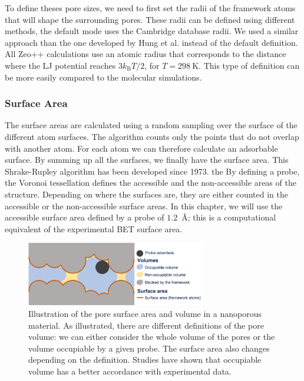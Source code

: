 \documentclass[main.tex]{subfiles}
\begin{document}
To define theses pore sizes, we need to first set the radii of the framework atoms that will shape the surrounding pores. These radii can be defined using different methods, the default mode uses the Cambridge database radii. We used a similar approach than the one developed by Hung et al. instead of the default definition.\cite{Hung_2021} All Zeo++ calculations use an atomic radius that corresponds to the distance where the LJ potential reaches $3 k_\text{B} T/2$, for $T = \SI{298}{\kelvin}$. This type of definition can be more easily compared to the molecular simulations.

\subsubsection{Surface Area}

The surface areas are calculated using a random sampling over the surface of the different atom surfaces. The algorithm counts only the points that do not overlap with another atom. For each atom we can therefore calculate an adsorbable surface. By summing up all the surfaces, we finally have the surface area. This Shrake-Rupley algorithm has been developed since 1973.\cite{Shrake1973} the By defining a probe, the Voronoi tessellation defines the accessible and the non-accessible areas of the structure. Depending on where the surfaces are, they are either counted in the accessible or the non-accessible surface areas. In this chapter, we will use the accessible surface area defined by a probe of $1.2$~\si{\angstrom}; this is a computational equivalent of the experimental  BET surface area.

\begin{figure}[h!]
  \centering
  \includegraphics[width=0.7\textwidth]{figures/1-screening/Pore_descriptors.jpg}
  \caption{Illustration of the pore surface area and volume in a nanoporous material. As illustrated, there are different definitions of the pore volume: we can either consider the whole volume of the pores or the volume occupiable by a given probe. The surface area also changes depending on the definition. Studies have shown that occupiable volume has a better accordance with experimental data.\cite{vol_Ongari2017}}\label{fgr:pores}
\end{figure}
\end{document}
